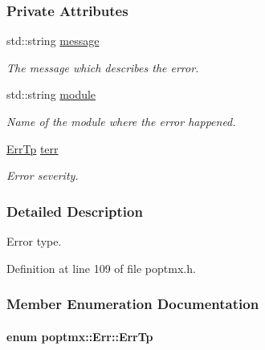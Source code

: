 \subsubsection*{Private Attributes}
\begin{DoxyCompactItemize}
\item 
std::string \hyperlink{classpoptmx_1_1Err_ac4270c7e8a4b08abe20c6a14a875a2d6}{message}
\begin{DoxyCompactList}\small\item\em The message which describes the error. \item\end{DoxyCompactList}\item 
std::string \hyperlink{classpoptmx_1_1Err_a8a9576733b21c666d739a2b97aa2fa93}{module}
\begin{DoxyCompactList}\small\item\em Name of the module where the error happened. \item\end{DoxyCompactList}\item 
\hyperlink{classpoptmx_1_1Err_a5536fbfa146a3c996c8d24282451d4aa}{ErrTp} \hyperlink{classpoptmx_1_1Err_a0eea8ad1572c999136c138d60bb0d225}{terr}
\begin{DoxyCompactList}\small\item\em Error severity. \item\end{DoxyCompactList}\end{DoxyCompactItemize}


\subsubsection{Detailed Description}
Error type. 

Definition at line 109 of file poptmx.h.



\subsubsection{Member Enumeration Documentation}
\hypertarget{classpoptmx_1_1Err_a5536fbfa146a3c996c8d24282451d4aa}{
\paragraph[{ErrTp}]{\setlength{\rightskip}{0pt plus 5cm}enum {\bf poptmx::Err::ErrTp}}\hfill}
\label{classpoptmx_1_1Err_a5536fbfa146a3c996c8d24282451d4aa}


